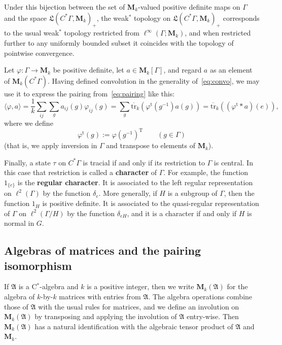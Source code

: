 \documentclass[12pt,a4paper]{article}
\numberwithin{equation}{section}
\theoremstyle{remark}
\renewcommand{\rm}[1]{\mathrm{#1}}
\newcommand{\rmM}{\mathbf{M}}
\newcommand{\A}{\mathfrak{A}}
\newcommand{\frL}{\mathfrak{L}}
\newcommand{\G}{\Gamma}
\renewcommand{\phi}{\varphi}
\newcommand{\tr}{\overline{\mathrm{tr}}}
\begin{document}
Under this bijection between the set of $\rmM_k$-valued positive definite maps on $\G$ and the space $\frL(C^\ast \G,\rmM_k)_+$, the weak$^\ast$ topology on $\frL(C^\ast \G,\rmM_k)_+$ corresponds to the usual weak$^\ast$ topology restricted from $\ell^\infty(\G;\rmM_k)$, and when restricted further to any uniformly bounded subset it coincides with the topology of pointwise convergence.

Let $\phi:\G\to\rmM_k$ be positive definite, let $a \in \rmM_k[\G]$, and regard $a$ as an element of $\rmM_k(C^\ast \G)$.  Having defined convolution in the generality of~\eqref{eq:convo}, we may use it to express the pairing from~\eqref{eq:pairing} like this:
\begin{equation}\label{eq:matrix-pos-def-convo}
\langle \phi,a\rangle = \frac{1}{k}\sum_{ij}\sum_g a_{ij}(g)\phi_{ij}(g) = \sum_g\tr_k (\phi^\rm{t}(g^{-1}) a(g)) = \tr_k((\phi^\rm{t}\ast a)(e)),
\end{equation}
where we define
\begin{equation}\label{eq:phi-hatphi}
\phi^\rm{t}(g) := \phi(g^{-1})^\rm{T} \qquad (g \in \G)
\end{equation}
(that is, we apply inversion in $\G$ and transpose to elements of $\rmM_k$).

Finally, a state $\tau$ on $C^\ast \G$ is tracial if and only if its restriction to $\G$ is central.  In this case that restriction is called a \textbf{character} of $\G$.  For example, the function $1_{\{e\}}$ is the \textbf{regular character}.  It is associated to the left regular representation on $\ell^2(\G)$ by the function $\delta_e$.  More generally, if $H$ is a subgroup of $\G$, then the function $1_H$ is positive definite.  It is associated to the quasi-regular representation of $\G$ on $\ell^2(\G/H)$ by the function $\delta_{eH}$, and it is a character if and only if $H$ is normal in $G$.











\subsection{Algebras of matrices and the pairing isomorphism}

If $\A$ is a C$^\ast$-algebra and $k$ is a positive integer, then we write $\rmM_k(\A)$ for the algebra of $k$-by-$k$ matrices with entries from $\A$. The algebra operations combine those of $\A$ with the usual rules for matrices, and we define an involution on $\rmM_k(\A)$ by transposing and applying the involution of $\A$ entry-wise.  Then $\rmM_k(\A)$ has a natural identification with the algebraic tensor product of $\A$ and $\rmM_k$.
\end{document}
